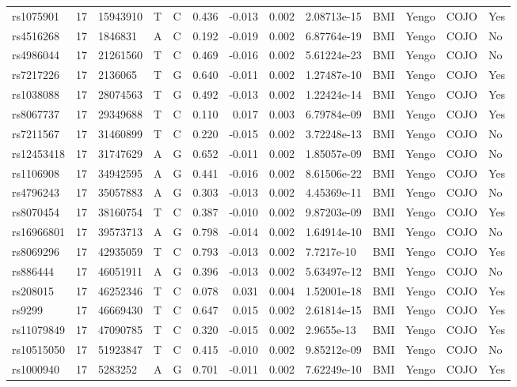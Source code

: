 \documentclass[11pt,twoside]{bristolthesis}
\begin{document}
\begin{longtable}[t]{lrlllrrrlllll}
rs1075901 & 17 & 15943910 & T & C & 0.436 & -0.013 & 0.002 & 2.08713e-15 & BMI & Yengo & COJO & Yes\\
\addlinespace
rs4516268 & 17 & 1846831 & A & C & 0.192 & -0.019 & 0.002 & 6.87764e-19 & BMI & Yengo & COJO & No\\
rs4986044 & 17 & 21261560 & T & C & 0.469 & -0.016 & 0.002 & 5.61224e-23 & BMI & Yengo & COJO & No\\
rs7217226 & 17 & 2136065 & T & G & 0.640 & -0.011 & 0.002 & 1.27487e-10 & BMI & Yengo & COJO & Yes\\
rs1038088 & 17 & 28074563 & T & G & 0.492 & -0.013 & 0.002 & 1.22424e-14 & BMI & Yengo & COJO & Yes\\
rs8067737 & 17 & 29349688 & T & C & 0.110 & 0.017 & 0.003 & 6.79784e-09 & BMI & Yengo & COJO & Yes\\
\addlinespace
rs7211567 & 17 & 31460899 & T & C & 0.220 & -0.015 & 0.002 & 3.72248e-13 & BMI & Yengo & COJO & No\\
rs12453418 & 17 & 31747629 & A & G & 0.652 & -0.011 & 0.002 & 1.85057e-09 & BMI & Yengo & COJO & No\\
rs1106908 & 17 & 34942595 & A & G & 0.441 & -0.016 & 0.002 & 8.61506e-22 & BMI & Yengo & COJO & Yes\\
rs4796243 & 17 & 35057883 & A & G & 0.303 & -0.013 & 0.002 & 4.45369e-11 & BMI & Yengo & COJO & No\\
rs8070454 & 17 & 38160754 & T & C & 0.387 & -0.010 & 0.002 & 9.87203e-09 & BMI & Yengo & COJO & Yes\\
\addlinespace
rs16966801 & 17 & 39573713 & A & G & 0.798 & -0.014 & 0.002 & 1.64914e-10 & BMI & Yengo & COJO & No\\
rs8069296 & 17 & 42935059 & T & C & 0.793 & -0.013 & 0.002 & 7.7217e-10 & BMI & Yengo & COJO & Yes\\
rs886444 & 17 & 46051911 & A & G & 0.396 & -0.013 & 0.002 & 5.63497e-12 & BMI & Yengo & COJO & No\\
rs208015 & 17 & 46252346 & T & C & 0.078 & 0.031 & 0.004 & 1.52001e-18 & BMI & Yengo & COJO & Yes\\
rs9299 & 17 & 46669430 & T & C & 0.647 & 0.015 & 0.002 & 2.61814e-15 & BMI & Yengo & COJO & Yes\\
\addlinespace
rs11079849 & 17 & 47090785 & T & C & 0.320 & -0.015 & 0.002 & 2.9655e-13 & BMI & Yengo & COJO & Yes\\
rs10515050 & 17 & 51923847 & T & C & 0.415 & -0.010 & 0.002 & 9.85212e-09 & BMI & Yengo & COJO & No\\
rs1000940 & 17 & 5283252 & A & G & 0.701 & -0.011 & 0.002 & 7.62249e-10 & BMI & Yengo & COJO & Yes\\

\end{longtable}
\end{document}
